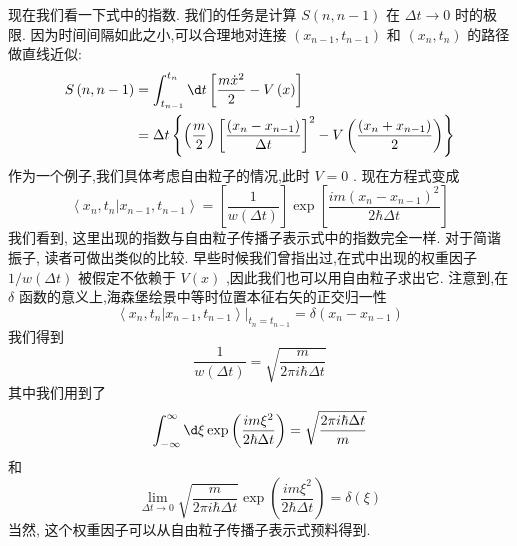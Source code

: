 现在我们看一下式中的指数. 我们的任务是计算 $S\left( {n, n - 1}\right)$ 在 ${\Delta t} \rightarrow 0$ 时的极限. 因为时间间隔如此之小,可以合理地对连接 $\left( {{x}_{n - 1},{t}_{n - 1}}\right)$ 和 $\left( {{x}_{n},{t}_{n}}\right)$ 的路径做直线近似:
\begin{equation}
\begin{aligned}
	S\left( {n, n - 1}\right) &= \int_{{t}_{n - 1}}^{{t}_{n}}{\d t}\left\lbrack {\frac{m{\dot{x}}^{2}}{2} - V\left( x\right) }\right\rbrack\\
	&= {\Delta t}\left\{ {\left( \frac{m}{2}\right) {\left\lbrack \frac{\left( {x}_{n} - {x}_{n - 1}\right) }{\Delta t}\right\rbrack }^{2} - V\left( \frac{\left( {x}_{n} + {x}_{n - 1}\right) }{2}\right) }\right\}
\end{aligned}
\end{equation}
作为一个例子,我们具体考虑自由粒子的情况,此时 $V = 0$ . 现在方程式变成
\begin{equation}
\left\langle {{x}_{n},{t}_{n} | {x}_{n - 1},{t}_{n - 1}}\right\rangle = \left\lbrack \frac{1}{w\left( {\Delta t}\right) }\right\rbrack \exp \left\lbrack \frac{{im}{\left( {x}_{n} - {x}_{n - 1}\right) }^{2}}{2\hbar {\Delta t}}\right\rbrack
\end{equation}
我们看到, 这里出现的指数与自由粒子传播子表示式中的指数完全一样. 对于简谐振子, 读者可做出类似的比较.
早些时候我们曾指出过,在式中出现的权重因子 $1/w\left( {\Delta t}\right)$ 被假定不依赖于 $V\left( x\right)$ ,因此我们也可以用自由粒子求出它. 注意到,在 $\delta$ 函数的意义上,海森堡绘景中等时位置本征右矢的正交归一性
\begin{equation}
\left\langle {{x}_{n},{t}_{n} | {x}_{n - 1},{t}_{n - 1}}\right\rangle {\left. \right| }_{{t}_{n} = {t}_{n - 1}} = \delta \left( {{x}_{n} - {x}_{n - 1}}\right)
\end{equation}
我们得到
\begin{equation}
\frac{1}{w\left( {\Delta t}\right) } = \sqrt{\frac{m}{{2\pi i}\hbar {\Delta t}}}
\end{equation}
其中我们用到了
\begin{equation}
\int_{-\infty }^{\infty }{\d \xi }\exp \left( \frac{{im}{\xi }^{2}}{2\hbar {\Delta t}}\right) = \sqrt{\frac{{2\pi i}\hbar {\Delta t}}{m}}
\end{equation}
和
\begin{equation}
\mathop{\lim }\limits_{{{\Delta t} \rightarrow 0}}\sqrt{\frac{m}{{2\pi i}\hbar {\Delta t}}}\exp \left( \frac{{im}{\xi }^{2}}{2\hbar {\Delta t}}\right) = \delta \left( \xi \right)
\end{equation}
当然, 这个权重因子可以从自由粒子传播子表示式预料得到.

